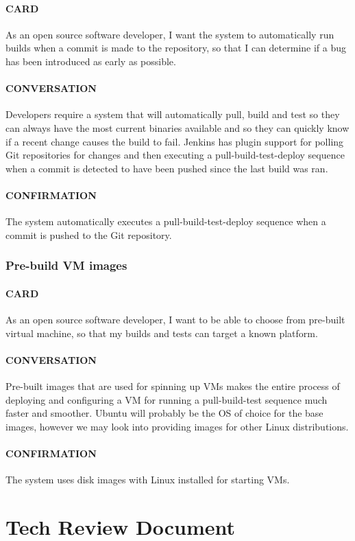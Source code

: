 \documentclass[10pt,letterpaper,onecolumn,draftclsnofoot]{IEEEtran}
\begin{document}
\paragraph{CARD}
As an open source software developer, I want the system to automatically run builds when a commit is made to the repository, so that I can determine if a bug has been introduced as early as possible.
\paragraph{CONVERSATION}
Developers require a system that will automatically pull, build and test so they can always have the most current
binaries available and so they can quickly know if a recent change causes the build to fail. Jenkins has plugin support for polling
Git repositories for changes and then executing a pull-build-test-deploy sequence when a commit is detected to have been pushed since
the last build was ran.
\paragraph{CONFIRMATION}
The system automatically executes a pull-build-test-deploy sequence when a commit is pushed to the Git repository.

\subsubsection{Pre-build VM images}
\paragraph{CARD}
As an open source software developer, I want to be able to choose from pre-built virtual machine, so that my builds and tests can target a known platform. 
\paragraph{CONVERSATION}
Pre-built images that are used for spinning up VMs makes the entire process of deploying and configuring a VM
for running a pull-build-test sequence much faster and smoother. Ubuntu will probably be the OS of choice for the base images, however
we may look into providing images for other Linux distributions.
\paragraph{CONFIRMATION}
The system uses disk images with Linux installed for starting VMs.
\clearpage
\section{Tech Review Document}
\end{document}
